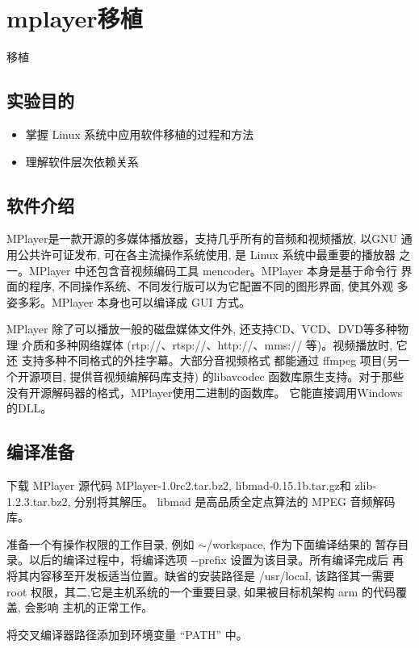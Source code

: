 \chapter{mplayer移植}{移植}

\section{实验目的}
\begin{itemize}\itemsep=-3pt
  \item 掌握 Linux 系统中应用软件移植的过程和方法
  \item 理解软件层次依赖关系
\end{itemize}

\section{软件介绍}

	MPlayer是一款开源的多媒体播放器，支持几乎所有的音频和视频播放, 以GNU
通用公共许可证发布, 可在各主流操作系统使用, 是 Linux 系统中最重要的播放器
之一。MPlayer 中还包含音视频编码工具 mencoder。MPlayer 本身是基于命令行
界面的程序, 不同操作系统、不同发行版可以为它配置不同的图形界面, 使其外观
多姿多彩。MPlayer 本身也可以编译成 GUI 方式。

	MPlayer 除了可以播放一般的磁盘媒体文件外, 还支持CD、VCD、DVD等多种物理
介质和多种网络媒体 (rtp://、rtsp://、http://、mms:// 等)。视频播放时, 它还
支持多种不同格式的外挂字幕。大部分音视频格式
都能通过 ffmpeg 项目(另一个开源项目, 提供音视频编解码库支持) 的libavcodec
函数库原生支持。对于那些没有开源解码器的格式，MPlayer使用二进制的函数库。
它能直接调用Windows的DLL。

\section{编译准备}

	下载 MPlayer 源代码 MPlayer-1.0rc2.tar.bz2, libmad-0.15.1b.tar.gz和
 zlib-1.2.3.tar.bz2, 分别将其解压。
 libmad 是高品质全定点算法的 MPEG 音频解码库。

	准备一个有操作权限的工作目录, 例如 $\sim$/workspace, 作为下面编译结果的
暂存目录。以后的编译过程中，将编译选项 -{}-prefix 设置为该目录。所有编译完成后
再将其内容移至开发板适当位置。缺省的安装路径是 /usr/local, 该路径其一需要root
权限，其二,它是主机系统的一个重要目录, 如果被目标机架构 arm 的代码覆盖, 会影响
主机的正常工作。

	将交叉编译器路径添加到环境变量 ``PATH'' 中。

